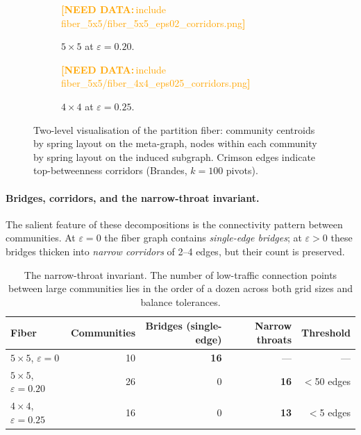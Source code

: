 \documentclass[11pt]{article}
\newcommand{\needdata}[1]{\textcolor{orange}{\textbf{[NEED DATA:}\,#1\textbf{]}}}
\begin{document}
\begin{figure}[H]
  \centering
  \begin{subfigure}[t]{0.48\textwidth}
    \centering
    \needdata{include fiber\_5x5/fiber\_5x5\_eps02\_corridors.png}\\
    \caption{$5 \times 5$ at $\varepsilon = 0.20$.}
    \label{fig:fiber-corridor-5x5}
  \end{subfigure}\hfill
  \begin{subfigure}[t]{0.48\textwidth}
    \centering
    \needdata{include fiber\_5x5/fiber\_4x4\_eps025\_corridors.png}\\
    \caption{$4 \times 4$ at $\varepsilon = 0.25$.}
    \label{fig:fiber-corridor-4x4}
  \end{subfigure}
  \caption{Two-level visualisation of the partition fiber:
    community centroids by spring layout on the meta-graph, nodes
    within each community by spring layout on the induced subgraph.
    Crimson edges indicate top-betweenness corridors (Brandes,
    $k = 100$ pivots).}
  \label{fig:fiber-corridors}
\end{figure}

\paragraph{Bridges, corridors, and the narrow-throat invariant.}\label{sec:fiber-corridors-invariant}

The salient feature of these decompositions is the connectivity pattern
between communities. At $\varepsilon = 0$ the fiber graph contains
\emph{single-edge bridges}; at $\varepsilon > 0$ these bridges thicken
into \emph{narrow corridors} of 2--4 edges, but their count is
preserved.

\begin{table}[H]
\centering
\small
\begin{tabular}{lrrrr}
\toprule
Fiber & Communities & Bridges (single-edge) & Narrow throats & Threshold \\
\midrule
$5 \times 5$, $\varepsilon = 0$    & 10 & \textbf{16} & ---          & ---         \\
$5 \times 5$, $\varepsilon = 0.20$ & 26 & 0           & \textbf{16}  & $<$50 edges \\
$4 \times 4$, $\varepsilon = 0.25$ & 16 & 0           & \textbf{13}  & $<$5 edges  \\
\bottomrule
\end{tabular}
\caption{The narrow-throat invariant. The number of low-traffic
  connection points between large communities lies in the order of
  a dozen across both grid sizes and balance tolerances.}
\label{tab:narrow-throats}
\end{table}
\end{document}
